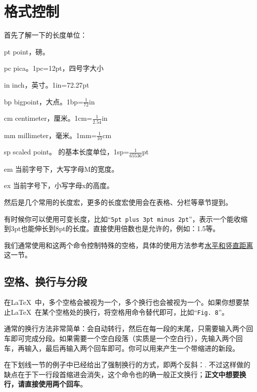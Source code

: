 \section{格式控制}
首先了解一下的长度单位：
\begin{fead}
  \item[pt] point，磅。\label{sec:length}
  \item[pc] pica。1pc=12pt，四号字大小
  \item[in] inch，英寸。1in=72.27pt
  \item[bp] bigpoint，大点。1bp=$\frac{1}{72}$in
  \item[cm] centimeter，厘米。1cm=$\frac{1}{2.54}$in
  \item[mm] millimeter，毫米。1mm=$\frac{1}{10}$cm
  \item[sp] scaled point。 的基本长度单位，1sp=$\frac{1}{65536}$pt
  \item[em] 当前字号下，大写字母M的宽度。
  \item[ex] 当前字号下，小写字母x的高度。
\end{fead}

然后是几个常用的长度宏，更多的长度宏使用会在表格、分栏等章节提到。
\begin{latex}
\textwidth %
\linewidth %
\end{latex}

有时候你可以使用可变长度，比如“\texttt{5pt plus 3pt minus 2pt}”，表示一个能收缩到3pt也能伸长到8pt的长度。直接使用倍数也是允许的，例如：1.5等。

我们通常使用和这两个命令控制特殊的空格，具体的使用方法参考\hyperref[sec:hvspace]{水平和竖直距离}这一节。

\subsection{空格、换行与分段}
在\LaTeX\ 中，多个空格会被视为一个，多个换行也会被视为一个。如果你想要禁止\LaTeX\ 在某个空格处的换行，将空格用\texttt{}命令替代即可，比如“\texttt{Fig. 8}”。

通常的换行方法非常简单：会自动转行，然后在每一段的末尾，只需要输入两个回车即可完成分段。如果需要一个空白段落（实质是一个空白行），先输入两个回车，再输入，最后再输入两个回车即可。你可以用来产生一个带缩进的新段。

在下划线一节的例子中已经给出了强制换行的方式，即两个反斜：. 不过这样做的缺点在于下一行段首缩进会消失，这个命令也的确一般正文换行；\textbf{正文中想要换行，请直接使用两个回车}。

